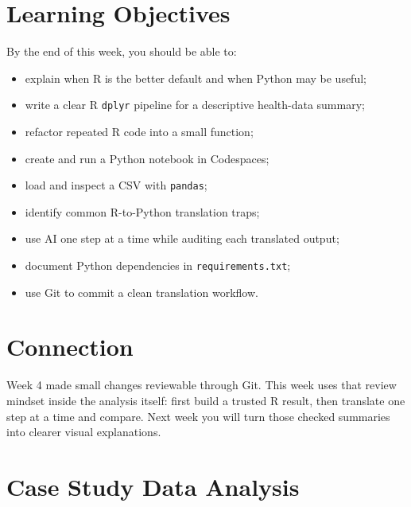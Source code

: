 \documentclass[
  letterpaper,
  DIV=11,
  numbers=noendperiod,
  oneside]{scrreprt}
\providecommand{\tightlist}{%
  \setlength{\itemsep}{0pt}\setlength{\parskip}{0pt}}
\begin{document}
\section*{Learning Objectives}\label{learning-objectives-1}


By the end of this week, you should be able to:

\begin{itemize}
\tightlist
\item
  explain when R is the better default and when Python may be useful;
\item
  write a clear R \texttt{dplyr} pipeline for a descriptive health-data
  summary;
\item
  refactor repeated R code into a small function;
\item
  create and run a Python notebook in Codespaces;
\item
  load and inspect a CSV with \texttt{pandas};
\item
  identify common R-to-Python translation traps;
\item
  use AI one step at a time while auditing each translated output;
\item
  document Python dependencies in \texttt{requirements.txt};
\item
  use Git to commit a clean translation workflow.
\end{itemize}

\section*{Connection}\label{connection-4}


Week 4 made small changes reviewable through Git. This week uses that
review mindset inside the analysis itself: first build a trusted R
result, then translate one step at a time and compare. Next week you
will turn those checked summaries into clearer visual explanations.

\section*{Case Study Data Analysis}\label{case-study-data-analysis-2}

\end{document}
